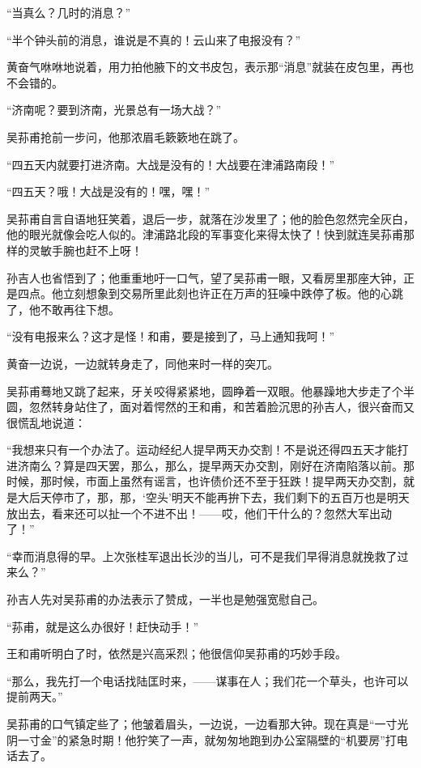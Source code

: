 \par “当真么？几时的消息？”
\par “半个钟头前的消息，谁说是不真的！云山来了电报没有？”
\par 黄奋气咻咻地说着，用力拍他腋下的文书皮包，表示那“消息”就装在皮包里，再也不会错的。
\par “济南呢？要到济南，光景总有一场大战？”
\par 吴荪甫抢前一步问，他那浓眉毛簌簌地在跳了。
\par “四五天内就要打进济南。大战是没有的！大战要在津浦路南段！”
\par “四五天？哦！大战是没有的！嘿，嘿！”
\par 吴荪甫自言自语地狂笑着，退后一步，就落在沙发里了；他的脸色忽然完全灰白，他的眼光就像会吃人似的。津浦路北段的军事变化来得太快了！快到就连吴荪甫那样的灵敏手腕也赶不上呀！
\par 孙吉人也省悟到了；他重重地吁一口气，望了吴荪甫一眼，又看房里那座大钟，正是四点。他立刻想象到交易所里此刻也许正在万声的狂噪中跌停了板。他的心跳了，他不敢再往下想。
\par “没有电报来么？这才是怪！和甫，要是接到了，马上通知我呵！”
\par 黄奋一边说，一边就转身走了，同他来时一样的突兀。
\par 吴荪甫蓦地又跳了起来，牙关咬得紧紧地，圆睁着一双眼。他暴躁地大步走了个半圆，忽然转身站住了，面对着愕然的王和甫，和苦着脸沉思的孙吉人，很兴奋而又很慌乱地说道：
\par “我想来只有一个办法了。运动经纪人提早两天办交割！不是说还得四五天才能打进济南么？算是四天罢，那么，那么，提早两天办交割，刚好在济南陷落以前。那时候，那时候，市面上虽然有谣言，也许债价还不至于狂跌！提早两天办交割，就是大后天停市了，那，那，‘空头’明天不能再拚下去，我们剩下的五百万也是明天放出去，看来还可以扯一个不进不出！——哎，他们干什么的？忽然大军出动了！”
\par “幸而消息得的早。上次张桂军退出长沙的当儿，可不是我们早得消息就挽救了过来么？”
\par 孙吉人先对吴荪甫的办法表示了赞成，一半也是勉强宽慰自己。
\par “荪甫，就是这么办很好！赶快动手！”
\par 王和甫听明白了时，依然是兴高采烈；他很信仰吴荪甫的巧妙手段。
\par “那么，我先打一个电话找陆匡时来，——谋事在人；我们花一个草头，也许可以提前两天。”
\par 吴荪甫的口气镇定些了；他皱着眉头，一边说，一边看那大钟。现在真是“一寸光阴一寸金”的紧急时期！他狞笑了一声，就匆匆地跑到办公室隔壁的“机要房”打电话去了。
